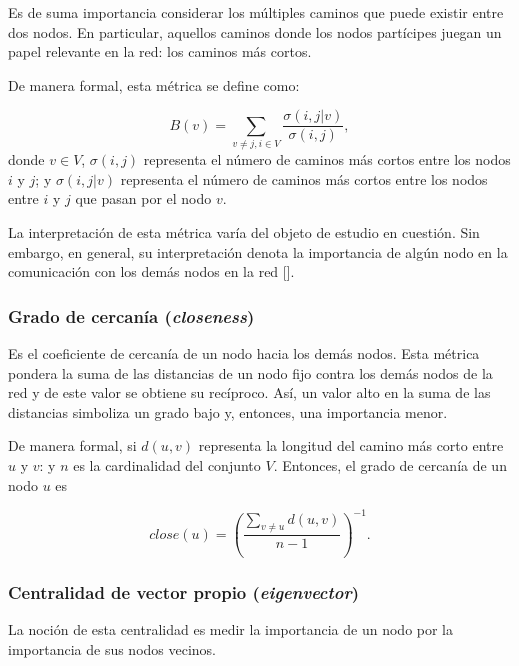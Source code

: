 \documentclass[../main.tex]{subfiles}
\begin{document}
Es de suma importancia considerar los múltiples caminos que puede existir entre dos nodos.  En particular, aquellos caminos donde los nodos partícipes juegan un papel relevante en la red: los caminos más cortos. 

De manera formal, esta métrica se define como: 

\begin{equation}
    \label{eq:betweennes}
    B(v) = \sum_{v \neq j, i \in V} \frac{ \sigma( i,j | v) }{\sigma( i,j)} ,  
\end{equation}
donde $v \in V$, $\sigma(i,j)$ representa el número de caminos más cortos entre los nodos $i$ y $j$; y $\sigma(i,j|v)$ representa el número de caminos más cortos entre los nodos  entre $i$ y $j$ que pasan por el nodo $v$. 

La interpretación de esta métrica varía del objeto de estudio en cuestión. Sin embargo, en general, su interpretación denota la  importancia de algún nodo en la comunicación con los demás nodos en la red [\cite{newman2018networks}]. 


\subsubsection{Grado de cercanía (\textit{closeness}) }

Es el coeficiente de cercanía de un nodo hacia los demás nodos. Esta métrica pondera la suma de las distancias de un nodo fijo contra los demás nodos de la red y de este valor se obtiene su recíproco. Así, un valor alto en la suma de las distancias simboliza un grado bajo y, entonces, una importancia menor. 

De manera formal, si $d(u,v)$ representa la longitud del camino más corto entre $u$ y $v$: y $n$ es la cardinalidad del conjunto $V$. Entonces, el grado de cercanía de un nodo $u$ es 

\begin{equation}
    \label{marcoteorico_closeness}
    close(u) = \left(\frac{\sum_{v \neq u} d(u,v) }{n-1} \right) ^{-1}.
\end{equation}





\subsubsection{Centralidad de vector propio (\textit{eigenvector}) }


La noción de esta centralidad es medir la importancia de un nodo por la importancia de sus nodos vecinos. 
\end{document}

